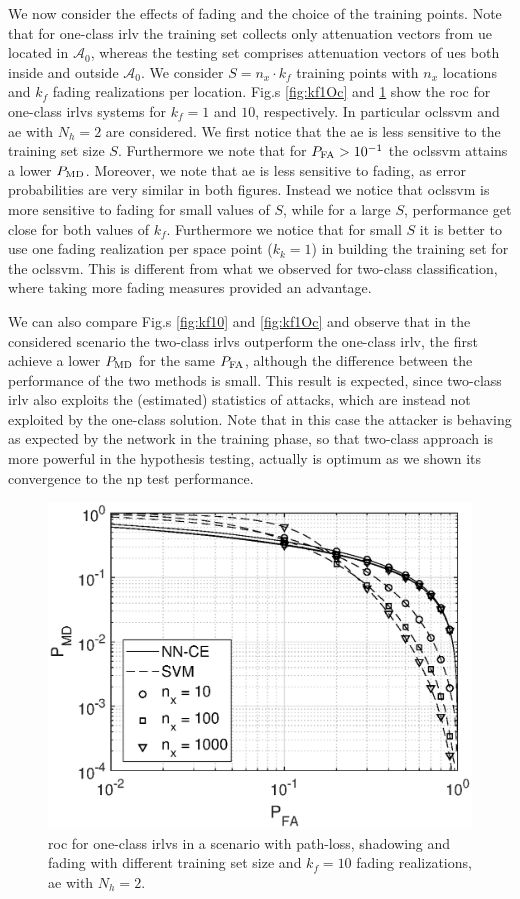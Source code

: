 \documentclass[draftcls,onecolumn,12pt]{IEEEtran}
\begin{document}
We now consider the effects of fading and the choice of the training points. Note that for one-class \ac{irlv} the training set collects only attenuation vectors from \ac{ue} located in $\mathcal{A}_0$, whereas the testing set comprises attenuation vectors of \acp{ue} both inside and outside $\mathcal A_0$. We consider $S = n_x \cdot k_f$ training points with $n_x$ locations and $k_f$ fading realizations per location. Fig.s \ref{fig:kf1Oc} and \ref{fig:kf10Oc} show the \ac{roc} for one-class \acp{irlv} systems for $k_f = 1$ and $10$, respectively. In particular \ac{oclssvm} and  \ac{ae} with $N_h=2$ are considered.  We first notice that the \ac{ae} is less sensitive to the training set size $S$. Furthermore we note that for $P_{\rm FA} > 10^{-1}$ the \ac{oclssvm} attains a lower  $P_{\rm MD}$. Moreover, we note that \ac{ae} is less sensitive to fading, as error probabilities are very similar in both figures. Instead we notice that  \ac{oclssvm} is more sensitive to fading for small values of $S$, while for a large $S$, performance get close for both values of $k_f$. Furthermore we notice that for small $S$ it is better to use one fading realization per space point ($k_k=1$) in building the training set for the \ac{oclssvm}. This is different  from what we observed for two-class classification, where taking more fading measures provided an advantage.  

We can also compare Fig.s \ref{fig:kf10} and \ref{fig:kf1Oc} and observe  that in the considered scenario the two-class \acp{irlv} outperform the one-class \ac{irlv}, the first achieve a lower $P_{\rm MD}$ for the same $P_{\rm FA}$, although the difference between the performance of the two methods is small. This result is expected, since two-class \ac{irlv} also exploits the (estimated) statistics of attacks, which are instead not exploited by the one-class solution. Note that in this case the attacker is behaving as expected by the network in the training phase, so that two-class approach is more powerful in the hypothesis testing, actually is optimum  as we shown its convergence to the \ac{np} test performance.
 
 
 

\begin{figure}[t]
    \centering
    \includegraphics[width=0.6\columnwidth]{res_avgnTrain_oneClass_kf10.eps}
    \caption{\ac{roc} for one-class \acp{irlv} in a scenario with path-loss, shadowing and fading with different training set size and $k_f=10$ fading realizations,  \ac{ae} with $N_h = 2$. }
    \label{fig:kf10Oc}
\end{figure}
\end{document}
